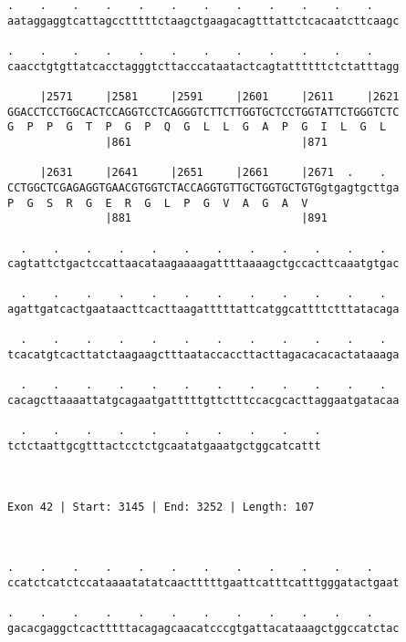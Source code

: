 \documentclass{article}
\begin{document}
\begin{Verbatim}
.    .    .    .    .    .    .    .    .    .    .    .    
aataggaggtcattagcctttttctaagctgaagacagtttattctcacaatcttcaagc
                                                            
.    .    .    .    .    .    .    .    .    .    .    .    
caacctgtgttatcacctagggtcttacccataatactcagtattttttctctatttagg
                                                            
     |2571     |2581     |2591     |2601     |2611     |2621
GGACCTCCTGGCACTCCAGGTCCTCAGGGTCTTCTTGGTGCTCCTGGTATTCTGGGTCTC
G  P  P  G  T  P  G  P  Q  G  L  L  G  A  P  G  I  L  G  L  
               |861                          |871           
  
     |2631     |2641     |2651     |2661     |2671  .    .  
CCTGGCTCGAGAGGTGAACGTGGTCTACCAGGTGTTGCTGGTGCTGTGgtgagtgcttga
P  G  S  R  G  E  R  G  L  P  G  V  A  G  A  V              
               |881                          |891           
  
  .    .    .    .    .    .    .    .    .    .    .    .  
cagtattctgactccattaacataagaaaagattttaaaagctgccacttcaaatgtgac
                                                            
  .    .    .    .    .    .    .    .    .    .    .    .  
agattgatcactgaataacttcacttaagatttttattcatggcattttctttatacaga
                                                            
  .    .    .    .    .    .    .    .    .    .    .    .  
tcacatgtcacttatctaagaagctttaataccaccttacttagacacacactataaaga
                                                            
  .    .    .    .    .    .    .    .    .    .    .    .  
cacagcttaaaattatgcagaatgatttttgttctttccacgcacttaggaatgatacaa
                                                            
  .    .    .    .    .    .    .    .    .    .
tctctaattgcgtttactcctctgcaatatgaaatgctggcatcattt
                                                
                                                
 
Exon 42 | Start: 3145 | End: 3252 | Length: 107



.    .    .    .    .    .    .    .    .    .    .    .    
ccatctcatctccataaaatatatcaactttttgaattcatttcatttgggatactgaat
                                                            
.    .    .    .    .    .    .    .    .    .    .    .    
gacacgaggctcactttttacagagcaacatcccgtgattacataaagctggccatctac
                                                            

\end{Verbatim}
\end{document}
